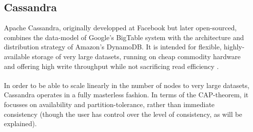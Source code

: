 \documentclass{article}
\begin{document}
\subsection{Cassandra}

Apache Cassandra, originally developped at Facebook but later open-sourced, combines the data-model of Google's BigTable system with the architecture and distribution strategy of Amazon's DynamoDB. It is intended for flexible, highly-available storage of very large datasets, running on cheap commodity hardware and offering high write throughput while not sacrificing read efficiency \cite{lakshman2010cassandra}.\\\\


In order to be able to scale linearly in the number of nodes to very large datasets, Cassandra operates in a fully masterless fashion. In terms of the CAP-theorem, it focusses on availability and partition-tolerance, rather than immediate consistency (though the user has control over the level of consistency, as will be explained). %



{}

\end{document}
